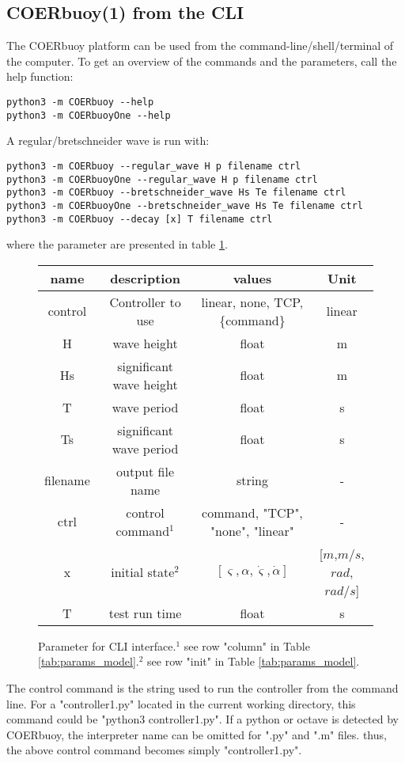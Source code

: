 \documentclass[oneside,10pt,a4paper]{book}
\begin{document}
\subsection{COERbuoy(1) from the CLI}
The COERbuoy platform can be used from the command-line/shell/terminal of the computer. To get an overview of the commands and the parameters, call the help function:
\begin{verbatim}
python3 -m COERbuoy --help
python3 -m COERbuoyOne --help
\end{verbatim}
A regular/bretschneider wave is run with:
\begin{verbatim}
python3 -m COERbuoy --regular_wave H p filename ctrl
python3 -m COERbuoyOne --regular_wave H p filename ctrl
python3 -m COERbuoy --bretschneider_wave Hs Te filename ctrl
python3 -m COERbuoyOne --bretschneider_wave Hs Te filename ctrl
python3 -m COERbuoy --decay [x] T filename ctrl
\end{verbatim} 
where the parameter are presented in table \ref{tab:params_CLI}.
\begin{figure}[h!]\label{tab:params_CLI}
	\begin{tabular}{|c|c|c|c|}
		\hline
		name & description & values& Unit\\
		\hline
		control &Controller to use & linear, none, TCP, \{command\} & linear \\
		\hline
		H&wave height&float&m\\
		\hline
		Hs&significant wave height&float&m\\
		\hline
		T&wave period&float&s\\
		\hline
		Ts&significant wave period&float&s\\
		\hline
		filename&output file name&string&-\\
		\hline
		ctrl&control command$^1$&{command}, "TCP", "none", "linear"&-\\
		\hline
		x&initial state$^2$&$[\varsigma, \alpha, \dot{\varsigma}, \dot{\alpha}]$&[$m$,$m/s$,$rad$,$rad/s$]\\
		\hline
		T&test run time&float&s\\
		\hline
	\end{tabular}
	\caption{Parameter for CLI interface.$^1$ see row "column" in Table \ref{tab:params_model}.$^2$ see row "init" in Table \ref{tab:params_model}.}
\end{figure}
The control command is the string used to run the controller from the command line. For a "controller1.py" located in the current working directory, this command could be "python3 controller1.py". If a python or octave is detected by COERbuoy, the interpreter name can be omitted for ".py" and ".m" files. thus, the above control command becomes simply "controller1.py".
\end{document}
